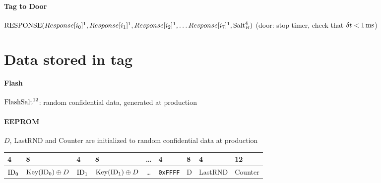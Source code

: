 \documentclass[a4paper,10pt]{scrartcl}
\begin{document}
\paragraph{Tag to Door} $\textnormal{RESPONSE}( Response[i_0]^1, Response[i_1]^1, Response[i_2]^1, \ldots Response[i_7]^1, \textnormal{Salt}_B^4 )$
(door: stop timer, check that $\delta t < 1\,\textnormal{ms}$)

\section{Data stored in tag}
\paragraph{Flash} $\textnormal{FlashSalt}^{12}$: random confidential data, generated at production
\paragraph{EEPROM} $D$, LastRND and Counter are initialized to random confidential data at production

\begin{tabular}{|*{2}{l|l||}c||l|l||l||l|}\hline
  4 & 8 & 4 & 8 & \ldots & 4 & 8 & 4 & 12 \\\hline
  $\textnormal{ID}_0$ & $\textnormal{Key}(\textnormal{ID}_0) \oplus D$ &
  $\textnormal{ID}_1$ & $\textnormal{Key}(\textnormal{ID}_1) \oplus D$ & \ldots &
  \verb|0xFFFF| & D &
  LastRND & Counter \\\hline
\end{tabular}
\end{document}
